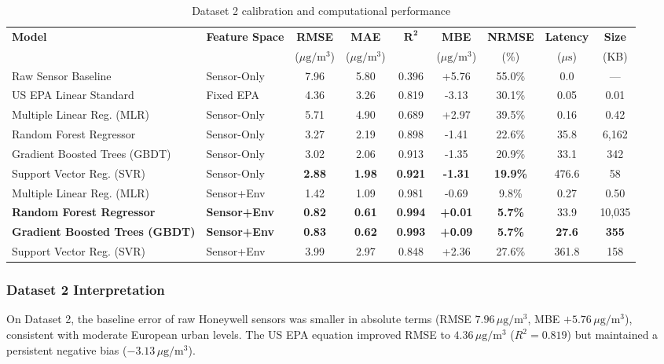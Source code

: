 \documentclass[11pt,a4paper]{article}
\begin{document}
\begin{table}[htbp]
\centering
\small
\caption{Dataset 2 calibration and computational performance}
\label{tab:results_d2}
\begin{tabularx}{\textwidth}{l l c c c c c c c}
\toprule
\textbf{Model} & \textbf{Feature Space} & \textbf{RMSE} & \textbf{MAE} & $\mathbf{R^2}$ & \textbf{MBE} & \textbf{NRMSE} & \textbf{Latency} & \textbf{Size} \\
& & ($\mu\text{g}/\text{m}^3$) & ($\mu\text{g}/\text{m}^3$) & & ($\mu\text{g}/\text{m}^3$) & (\%) & ($\mu\text{s}$) & (KB) \\
\midrule
Raw Sensor Baseline & Sensor-Only & 7.96 & 5.80 & 0.396 & +5.76 & 55.0\% & 0.0 & --- \\
US EPA Linear Standard & Fixed EPA & 4.36 & 3.26 & 0.819 & -3.13 & 30.1\% & 0.05 & 0.01 \\
Multiple Linear Reg. (MLR) & Sensor-Only & 5.71 & 4.90 & 0.689 & +2.97 & 39.5\% & 0.16 & 0.42 \\
Random Forest Regressor & Sensor-Only & 3.27 & 2.19 & 0.898 & -1.41 & 22.6\% & 35.8 & 6,162 \\
Gradient Boosted Trees (GBDT) & Sensor-Only & 3.02 & 2.06 & 0.913 & -1.35 & 20.9\% & 33.1 & 342 \\
Support Vector Reg. (SVR) & Sensor-Only & \textbf{2.88} & \textbf{1.98} & \textbf{0.921} & \textbf{-1.31} & \textbf{19.9\%} & 476.6 & 58 \\
\midrule
Multiple Linear Reg. (MLR) & Sensor+Env & 1.42 & 1.09 & 0.981 & -0.69 & 9.8\% & 0.27 & 0.50 \\
\textbf{Random Forest Regressor} & \textbf{Sensor+Env} & \textbf{0.82} & \textbf{0.61} & \textbf{0.994} & \textbf{+0.01} & \textbf{5.7\%} & 33.9 & 10,035 \\
\textbf{Gradient Boosted Trees (GBDT)} & \textbf{Sensor+Env} & \textbf{0.83} & \textbf{0.62} & \textbf{0.993} & \textbf{+0.09} & \textbf{5.7\%} & \textbf{27.6} & \textbf{355} \\
Support Vector Reg. (SVR) & Sensor+Env & 3.99 & 2.97 & 0.848 & +2.36 & 27.6\% & 361.8 & 158 \\
\bottomrule
\end{tabularx}
\end{table}

\subsubsection{Dataset 2 Interpretation}
On Dataset 2, the baseline error of raw Honeywell sensors was smaller in absolute terms (RMSE $7.96\,\mu\text{g}/\text{m}^3$, MBE $+5.76\,\mu\text{g}/\text{m}^3$), consistent with moderate European urban levels. The US EPA equation improved RMSE to $4.36\,\mu\text{g}/\text{m}^3$ ($R^2 = 0.819$) but maintained a persistent negative bias ($-3.13\,\mu\text{g}/\text{m}^3$).
\end{document}
